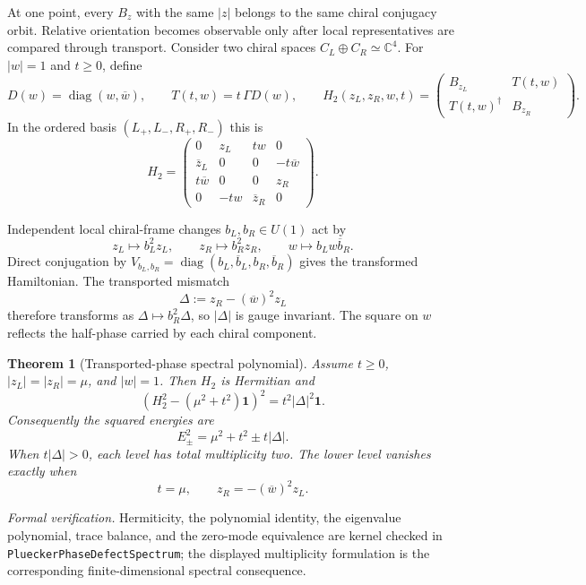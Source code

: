 \documentclass[11pt]{article}
\newcommand{\diag}{\operatorname{diag}}
\newcommand{\C}{\mathbb{C}}
\newcommand{\id}{\mathbf{1}}
\newtheorem{theorem}{Theorem}[section]
\begin{document}
At one point, every $B_z$ with the same $|z|$ belongs to the same chiral
conjugacy orbit.  Relative orientation becomes observable only after local
representatives are compared through transport.  Consider two chiral spaces
$C_L\oplus C_R\simeq\C^4$.  For $|w|=1$ and $t\geq0$, define
\begin{equation}\label{eq:H2blocks}
 D(w)=\diag(w,\overline w),\qquad
 T(t,w)=t\,\Gamma D(w),\qquad
 H_2(z_L,z_R,w,t)=
 \begin{pmatrix}B_{z_L}&T(t,w)\\T(t,w)^\dagger&B_{z_R}\end{pmatrix}.
\end{equation}
In the ordered basis $(L_+,L_-,R_+,R_-)$ this is
\begin{equation}\label{eq:H2matrix}
H_2=
\begin{pmatrix}
0&z_L&tw&0\\
\overline z_L&0&0&-t\overline w\\
t\overline w&0&0&z_R\\
0&-tw&\overline z_R&0
\end{pmatrix}.
\end{equation}

Independent local chiral-frame changes $b_L,b_R\in U(1)$ act by
\begin{equation}\label{eq:localphaseaction}
 z_L\mapsto b_L^2z_L,\qquad
 z_R\mapsto b_R^2z_R,\qquad
 w\mapsto b_Lw\overline b_R.
\end{equation}
Direct conjugation by
$V_{b_L,b_R}=\diag(b_L,\overline b_L,b_R,\overline b_R)$ gives the transformed
Hamiltonian.  The transported mismatch
\begin{equation}\label{eq:Delta}
 \Delta:=z_R-(\overline w)^2z_L
\end{equation}
therefore transforms as $\Delta\mapsto b_R^2\Delta$, so $|\Delta|$ is gauge
invariant.  The square on $w$ reflects the half-phase carried by each chiral
component.

\begin{theorem}[Transported-phase spectral polynomial]
\label{thm:phasespectrum}
Assume $t\geq0$, $|z_L|=|z_R|=\mu$, and $|w|=1$.  Then $H_2$ is Hermitian and
\begin{equation}\label{eq:phasepolynomial}
 \boxed{\left(H_2^2-(\mu^2+t^2)\id\right)^2
 =t^2|\Delta|^2\id.}
\end{equation}
Consequently the squared energies are
\begin{equation}\label{eq:phaseenergies}
 E_\pm^2=\mu^2+t^2\pm t|\Delta|.
\end{equation}
When $t|\Delta|>0$, each level has total multiplicity two.  The lower level
vanishes exactly when
\begin{equation}\label{eq:phasezeromode}
 t=\mu,\qquad z_R=-(\overline w)^2z_L.
\end{equation}
\end{theorem}
\noindent\textit{Formal verification.}  Hermiticity, the polynomial identity,
the eigenvalue polynomial, trace balance, and the zero-mode equivalence are
kernel checked in \texttt{PlueckerPhaseDefectSpectrum}; the displayed
multiplicity formulation is the corresponding finite-dimensional spectral
consequence.
\end{document}
